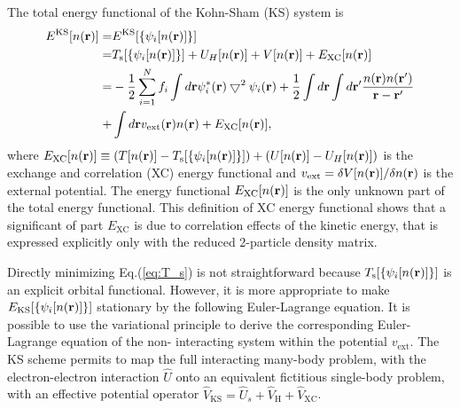 The total energy functional of the Kohn-Sham (KS) system is
\begin{align}
 E^{\text{KS}}[n({\bf r})]=&E^{\text{KS}}[\{\psi_i[n({\bf r})]\}]  \nonumber \\
        =&T_\text{s}[\{\psi_i[n({\bf r})]\}] +U_H[n({\bf r})] +V[n({\bf r})]+E_{\text{XC}}[n({\bf r})] \label{eq:T_s} \\
 =&-\frac{1}{2}\sum_{i=1}^N f_i \int d{\bf r} \psi_i^*({\bf r})\bigtriangledown^2\psi_i({\bf r})
 +\frac{1}{2}\int d{\bf r} \int d{\bf r}'\frac{n({\bf r})n({\bf r}')}{{\bf r}-{\bf r}'}  \nonumber \\
+&\int d{\bf r} v_{\text{ext}}({\bf r})n({\bf r}) + E_{\text{XC}}[n({\bf r})], \label{eq:E_KS}
 \end{align}
 where $ E_{\text{XC}}[n({\bf r})] \equiv (T[n({\bf r})] - T_\text{s}[\{\psi_i[n({\bf r})]\}])+(U[n({\bf r})]-U_H[n({\bf r})])$ 
 is the exchange and correlation (XC) energy functional and 
$v_{\text{ext}}=\delta V[n({\bf r})]/\delta n({\bf r})$ is the external potential. 
The energy functional $ E_{\text{XC}}[n({\bf r})]$ is the only unknown part of the total energy functional.
This definition of XC energy functional shows that a significant of part $E_{\text{XC}}$ is due to correlation effects 
of the kinetic energy, that is expressed explicitly only with the reduced 2-particle density matrix.

Directly minimizing Eq.\thinspace(\ref{eq:T_s}) is not straightforward because $T_\text{s}[\{\psi_i[n({\bf r})]\}]$ 
is an explicit orbital functional. However, it is more appropriate to
make $E_{\text{KS}} [\{\psi_i [n({\bf r})]\}]$ stationary by the following Euler-Lagrange equation.
It is possible to use the variational principle to derive the corresponding Euler-Lagrange equation of
the non- interacting system within the potential $v_{\text{ext}}$.
The KS scheme permits to map the full interacting many-body problem, with the electron-electron interaction $\hat U$
onto an equivalent fictitious single-body problem, with an effective potential operator 
$\hat V_{\text{KS}}=\hat U_s + \hat V_{\text{H}} + \hat V_{\text{XC}}$.

